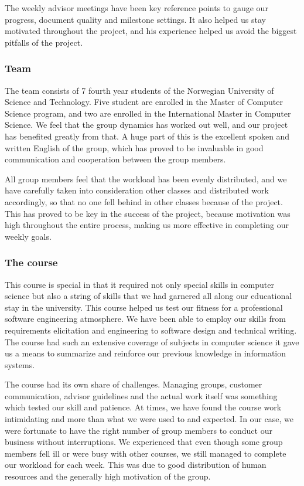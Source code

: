The weekly advisor meetings have been key reference points to gauge our
progress, document quality and milestone settings. It also helped us stay
motivated throughout the project, and his experience helped us avoid the biggest
pitfalls of the project.

\subsubsection{Team}
  The team consists of 7 fourth year students of the Norwegian University of
  Science and Technology. Five student are enrolled in the Master of Computer
  Science program, and two are enrolled in the International Master in Computer
  Science. We feel that the group dynamics has worked out well, and our project
  has benefited greatly from that. A huge part of this is the excellent spoken
  and written English of the group, which has proved to be invaluable in good
  communication and cooperation between the group members.

  All group members feel that the workload has been evenly distributed, and we
  have carefully taken into consideration other classes and distributed work
  accordingly, so that no one fell behind in other classes because of the
  project. This has proved to be key in the success of the project, because
  motivation was high throughout the entire process, making us more effective in
  completing our weekly goals.

\subsubsection{The course}

   This course is special in that it required not only special skills
   in computer science but also a string of skills that we had garnered all
   along our educational stay in the university. This course helped us test our
   fitness for a professional software engineering atmosphere. We have been able
   to employ our skills from requirements elicitation and engineering to
   software design and technical writing. The course had such an extensive
   coverage of subjects in computer science it gave us a means to
   summarize and reinforce our previous knowledge in information systems.

   The course had its own share of challenges. Managing groups, customer
   communication, advisor guidelines and the actual work itself was something
   which tested our skill and patience. At times, we have found the course work
    intimidating and more than what we were used to and expected. In our case,
   we were fortunate to have the right number of group members to conduct our
   business without interruptions. We experienced that even though some group
   members fell ill or were busy with other courses, we still managed to
   complete our workload for each week. This was due to good distribution of
   human resources and the generally high motivation of the group.
   
